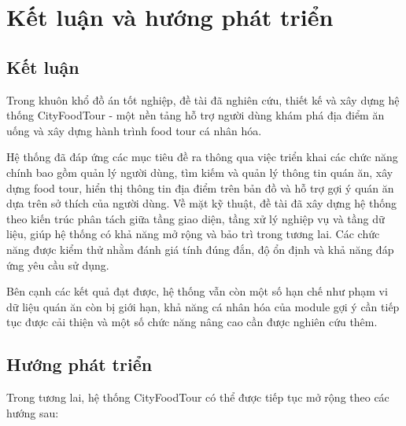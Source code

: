 \section{Kết luận và hướng phát triển}

\subsection{Kết luận}
Trong khuôn khổ đồ án tốt nghiệp, đề tài đã nghiên cứu, thiết kế và xây dựng hệ thống
CityFoodTour - một nền tảng hỗ trợ người dùng khám phá địa điểm ăn uống và xây dựng
hành trình food tour cá nhân hóa.

Hệ thống đã đáp ứng các mục tiêu đề ra thông qua việc triển khai các chức năng chính
bao gồm quản lý người dùng, tìm kiếm và quản lý thông tin quán ăn, xây dựng food tour,
hiển thị thông tin địa điểm trên bản đồ và hỗ trợ gợi ý quán ăn dựa trên sở thích của
người dùng.
Về mặt kỹ thuật, đề tài đã xây dựng hệ thống theo kiến trúc phân tách giữa tầng giao
diện, tầng xử lý nghiệp vụ và tầng dữ liệu, giúp hệ thống có khả năng mở rộng và bảo
trì trong tương lai. Các chức năng được kiểm thử nhằm đánh giá tính đúng đắn, độ ổn
định và khả năng đáp ứng yêu cầu sử dụng.

Bên cạnh các kết quả đạt được, hệ thống vẫn còn một số hạn chế như phạm vi dữ liệu quán ăn còn bị giới hạn, khả năng cá nhân hóa của module gợi ý cần 
tiếp tục được cải thiện và một số chức năng nâng cao cần được nghiên cứu thêm.


\subsection{Hướng phát triển}

Trong tương lai, hệ thống CityFoodTour có thể được tiếp tục mở rộng theo các
hướng sau:

